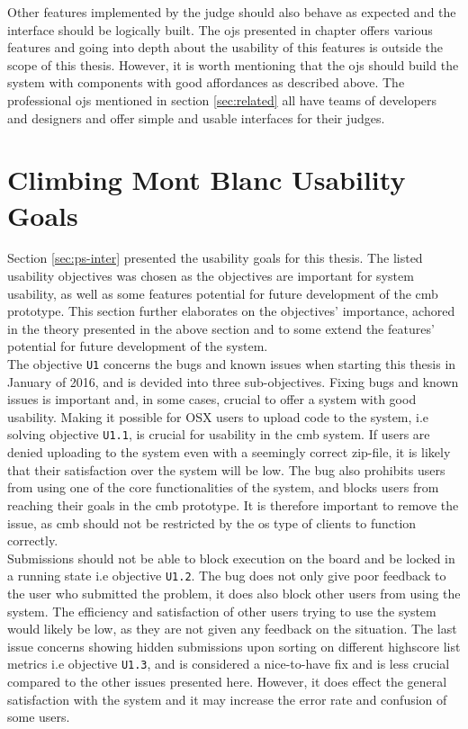 Other features implemented by the judge should also behave as expected and the interface should be logically built. The \glspl{oj} presented in chapter offers various features and going into depth about the usability of this features is outside the scope of this thesis. However, it is worth mentioning that the \glspl{oj} should build the system with components with good affordances as described above. The professional \glspl{oj} mentioned in section \ref{sec:related} all have teams of developers and designers and offer simple and usable interfaces for their judges.

\section{Climbing Mont Blanc Usability Goals}
\label{sec:cmb-usability}
Section \ref{sec:ps-inter} presented the usability goals for this thesis. The listed usability objectives was chosen as the objectives are important for system usability, as well as some features potential for future development of the \gls{cmb} prototype. This section further elaborates on the objectives' importance, achored in the theory presented in the above section and to some extend the features' potential for future development of the system. \\

The objective \texttt{U1} concerns the bugs and known issues when starting this thesis in January of 2016, and is devided into three sub-objectives. Fixing bugs and known issues is important and, in some cases, crucial to offer a system with good usability. Making it possible for OSX users to upload code to the system, i.e solving objective \texttt{U1.1}, is crucial for usability in the \gls{cmb} system. If users are denied uploading to the system even with a seemingly correct zip-file, it is likely that their satisfaction over the system will be low. The bug also prohibits users from using one of the core functionalities of the system, and blocks users from reaching their goals in the \gls{cmb} prototype. It is therefore important to remove the issue, as \gls{cmb} should not be restricted by the \gls{os} type of clients to function correctly. \\

Submissions should not be able to block execution on the board and be locked in a running state i.e objective \texttt{U1.2}. The bug does not only give poor feedback to the user who submitted the problem, it does also block other users from using the system. The efficiency and satisfaction of other users trying to use the system would likely be low, as they are not given any feedback on the situation. The last issue concerns showing hidden submissions upon sorting on different highscore list metrics i.e objective \texttt{U1.3}, and is considered a nice-to-have fix and is less crucial compared to the other issues presented here. However, it does effect the general satisfaction with the system and it may increase the error rate and confusion of some users. \\

